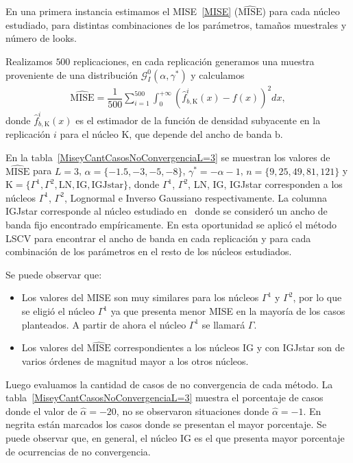 En una primera instancia estimamos el MISE~\eqref{MISE} ($\widehat{\text{MISE}}$) para cada núcleo estudiado, para distintas combinaciones de los parámetros, tamaños muestrales y número de looks. 

Realizamos $500$ replicaciones, en cada replicación generamos una muestra proveniente de una distribución $\mathcal{G}_I^0(\alpha,\gamma^*)$ y calculamos 
\begin{align}
\label{MiseEst}
\widehat{\text{MISE}}=\dfrac{1}{500} \sum_{i=1}^{500}\int_0^{+\infty} (\widehat{f}_{b,\text{K}}^i(x)-f(x))^2 dx,
\end{align}
donde $\widehat{f}_{b,\text{K}}^i(x)$ es el estimador de la función de densidad subyacente en la replicación $i$ para el núcleo $\text{K}$, que depende del ancho de banda $\text{b}$.

En la tabla~\ref{MiseyCantCasosNoConvergenciaL=3} se muestran los valores de $\widehat{\text{MISE}}$ para $L=3$, $\alpha=\{-1.5,-3,-5,-8\}$, $\gamma^*=-\alpha-1$, $n=\{9,25,49,81,121\}$ y $\text{K}=\{\Gamma^1,\Gamma^2,\text{LN},\text{IG},\text{IGJstar\}}$, donde $\Gamma^1$, $\Gamma^2$, LN, IG, IGJstar corresponden a los núcleos $\Gamma^1$, $\Gamma^2$, Lognormal e Inverso Gaussiano respectivamente. La columna IGJstar corresponde al núcleo estudiado en~\cite{gambini2015} donde se consideró un ancho de banda fijo encontrado empíricamente. En esta oportunidad se aplicó el método LSCV para encontrar el ancho de banda en cada replicación y para cada combinación de los parámetros en el resto de los núcleos estudiados.

Se puede observar que:
\begin{itemize}
	\item Los valores del MISE son muy similares para los núcleos $\Gamma^1$ y $\Gamma^2$, por lo que se eligió el núcleo $\Gamma^1$ ya que presenta menor MISE en la mayoría de los casos planteados. A partir de ahora el núcleo $\Gamma^1$ se llamará $\Gamma$.
	\item Los valores del $\widehat{\text{MISE}}$ correspondientes a los núcleos IG y con IGJstar son de varios órdenes de magnitud mayor a los otros núcleos.
\end{itemize} 

Luego evaluamos la cantidad de casos de no convergencia de cada método. La tabla~\ref{MiseyCantCasosNoConvergenciaL=3} muestra el porcentaje de casos donde el valor de $\widehat{\alpha}=-20$, no se observaron situaciones donde $\widehat{\alpha}=-1.$ En negrita están marcados los casos donde se presentan el mayor porcentaje. Se puede observar que, en general, el núcleo IG es el que presenta mayor porcentaje de ocurrencias de no convergencia.


